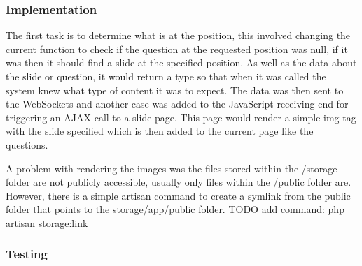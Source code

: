 \subsubsection{Implementation}
The first task is to determine what is at the position, this involved changing the current function to check if the question at the requested position was null, if it was then it should find a slide at the specified position. As well as the data about the slide or question, it would return a type so that when it was called the system knew what type of content it was to expect. The data was then sent to the WebSockets and another case was added to the JavaScript receiving end for triggering an AJAX call to a slide page. This page would render a simple img tag with the slide specified which is then added to the current page like the questions.

A problem with rendering the images was the files stored within the /storage folder are not publicly accessible, usually only files within the /public folder are. However, there is a simple artisan command to create a symlink from the public folder that points to the storage/app/public folder. TODO add command: php artisan storage:link
\subsubsection{Testing}
\newpage